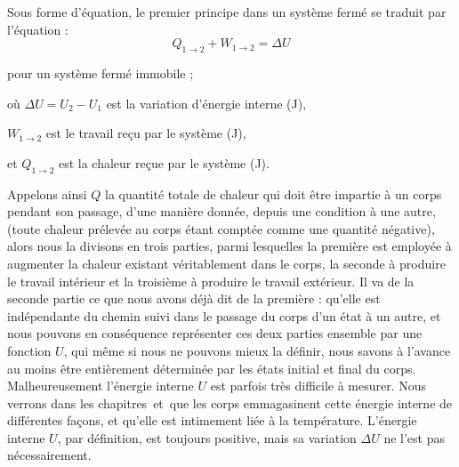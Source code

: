 	Sous forme d’équation, le premier principe dans un système fermé se traduit par l’équation :
	\begin{equation}
		Q_{1 \to 2} + W_{1 \to 2} = \Delta U
		\label{eq_premier_principe_sf_maj}
	\end{equation}
	\begin{equationterms}
		\item pour un système fermé immobile ;
		\item où \tab $\Delta U = U_2 - U_1$ est la variation d’énergie interne (\si{\joule}),
		\item 	\tab $W_{1 \to 2}$ 	\tab est le travail reçu par le système (\si{\joule}),
		\item et \tab $Q_{1 \to 2}$ 	\tab est la chaleur reçue par le système (\si{\joule}).
	\end{equationterms}

		Appelons ainsi $Q$ la quantité totale de chaleur qui doit être impartie à un corps pendant son passage, d’une manière donnée, depuis une condition à une autre, (toute chaleur prélevée au corps étant comptée comme une quantité négative), alors nous la divisons en trois parties, parmi lesquelles la première est employée à augmenter la chaleur existant véritablement dans le corps, la seconde à produire le travail intérieur et la troisième à produire le travail extérieur. Il va de la seconde partie ce que nous avons déjà dit de la première : qu’elle est indépendante du chemin suivi dans le passage du corps d’un état à un autre, et nous pouvons en conséquence représenter ces deux parties ensemble par une fonction $U$, qui même si nous ne pouvons mieux la définir, nous savons à l’avance au moins être entièrement déterminée par les états initial et final du corps.
	Malheureusement l’énergie interne $U$ est parfois très difficile à mesurer. Nous verrons dans les chapitres~\quatre et~\cinq que les corps emmagasinent cette énergie interne de différentes façons, et qu’elle est intimement liée à la température. L’énergie interne $U$, par définition, est toujours positive, mais sa variation $\Delta U$ ne l’est pas nécessairement.

